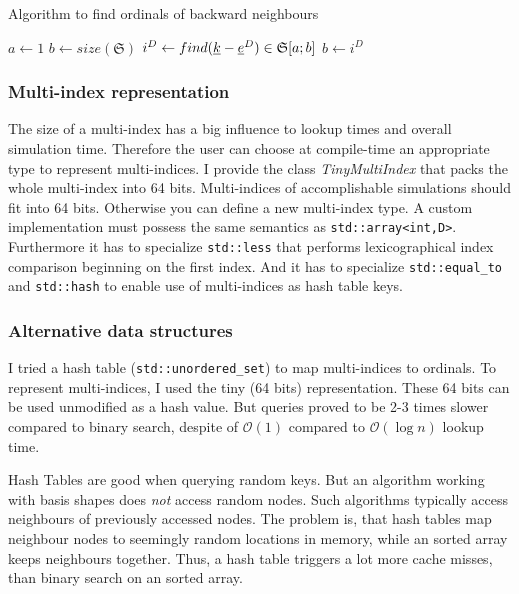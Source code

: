\documentclass{article}
\def\code#1{\texttt{#1}}
\def\classname#1{\textit{#1}}
\begin{document}
\begin{algorithm}[H]
  \caption{Algorithm to find ordinals of backward neighbours}
  \(a \leftarrow 1\)\;
  \(b \leftarrow size(\mathfrak{S})\)\;
  \(i^D \leftarrow find(\underline{k}-\underline{e}^D) \in \mathfrak{S}[a;b]\)\;
  \(b \leftarrow i^D\)\;
\end{algorithm}

\subsubsection{Multi-index representation}
The size of a multi-index has a big influence to lookup times and
overall simulation time. Therefore the user can choose at compile-time an appropriate
type to represent multi-indices. I provide the class \classname{TinyMultiIndex}
that packs the whole multi-index into 64 bits.
Multi-indices of accomplishable simulations should fit into 64 bits.
Otherwise you can define a new multi-index type. A custom implementation
must possess the same semantics as \code{std::array<int,D>}.
Furthermore it has to specialize \code{std::less} that performs lexicographical index comparison
beginning on the first index.
And it has to specialize \code{std::equal\_to} and \code{std::hash} to
enable use of multi-indices as hash table keys.

\subsubsection{Alternative data structures}
I tried a hash table (\code{std::unordered\_set}) to map multi-indices to ordinals.
To represent multi-indices, I used the tiny (64 bits) representation.
These 64 bits can be used unmodified as a hash value.
But queries proved to be 2-3 times slower compared to binary search,
despite of \(\mathcal{O}(1)\) compared to \(\mathcal{O}(\log{}n)\) lookup time.
\par
Hash Tables are good when querying random keys. But an algorithm working
with basis shapes does \emph{not} access random nodes.
Such algorithms typically access neighbours of previously accessed nodes.
The problem is, that hash tables
map neighbour nodes to seemingly random locations in memory,
while an sorted array keeps neighbours together. Thus, a hash table triggers
a lot more cache misses, than binary search on an sorted array.
\end{document}
